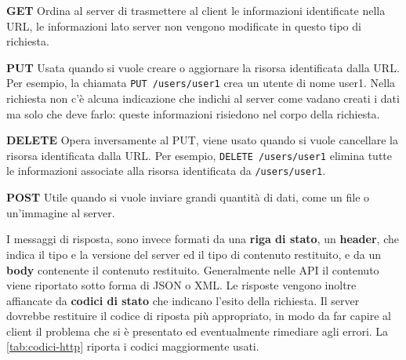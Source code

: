 \documentclass[italian, Lau, oneside, nodefaultfont, noexaminfo]{sapthesis}
\begin{document}
\begin{description}
    \item \textbf{GET} Ordina al server di trasmettere al client le informazioni identificate nella URL, le informazioni lato server non vengono modificate in questo tipo di richiesta. 
    \item \textbf{PUT} Usata quando si vuole creare o aggiornare la risorsa identificata dalla URL. Per esempio, la chiamata
    \texttt{PUT /users/user1}     crea un utente di nome user1. Nella richiesta non c'\`e alcuna indicazione che indichi  al server come vadano creati i dati ma solo che deve farlo: queste informazioni risiedono nel corpo della richiesta.
    \item \textbf{DELETE} Opera inversamente al PUT, viene usato quando si vuole cancellare la risorsa identificata dalla URL. Per esempio, \texttt{DELETE /users/user1}
    elimina tutte le informazioni associate alla risorsa identificata da \texttt{/users/user1}.
    \item  \textbf{POST} Utile  quando si vuole inviare grandi quantit\`a di dati, come un file o un'immagine al server.
 \end{description}


I messaggi di risposta, sono invece formati da una \textbf{riga di stato}, un \textbf{header}, che indica  il tipo e la versione del server ed il tipo di contenuto restituito, e da un \textbf{body} contenente il contenuto restituito. Generalmente  nelle API il contenuto viene riportato sotto forma di JSON o XML. Le risposte vengono inoltre affiancate  da \textbf{codici di stato} che indicano l'esito della richiesta. Il server dovrebbe restituire il codice di riposta pi\`u appropriato, in modo da far capire al client il problema che si \`e presentato ed eventualmente rimediare agli errori. La \autoref{tab:codici-http} riporta i codici maggiormente usati.
\end{document}
